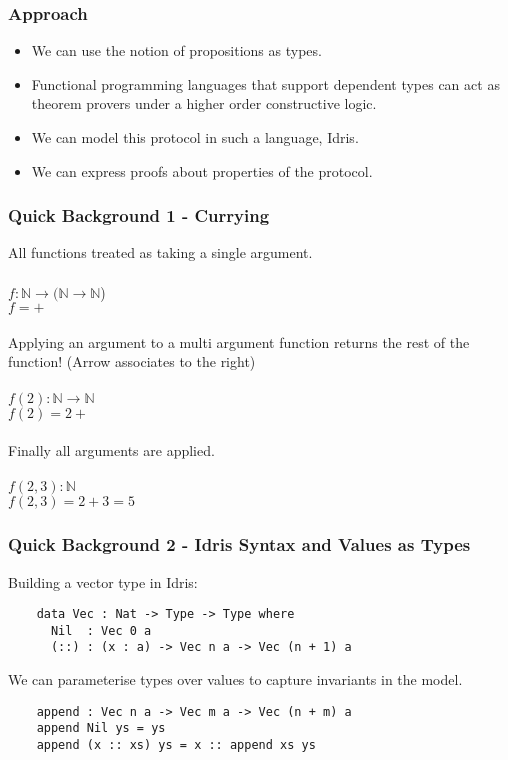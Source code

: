 \documentclass{beamer}
\begin{document}
\begin{frame}[fragile]
  \frametitle{Approach}
  \begin{itemize}
    \item We can use the notion of propositions as types.
    \item Functional programming languages that support dependent
          types can act as theorem provers under a higher order
          constructive logic.
    \item We can model this protocol in such a language, Idris.
    \item We can express proofs about properties of the protocol.
  \end{itemize}
\end{frame}

\begin{frame}[fragile]
  \frametitle{Quick Background 1 - Currying}
  All functions treated as taking a single argument. \\ \\
  $f : \mathbb{N} \rightarrow (\mathbb{N} \rightarrow \mathbb{N}$) 
    \\
  $f = + $ \\ \\
  Applying an argument to a multi argument function returns the 
    rest of the function! (Arrow associates to the right)\\ \\
  $f(2) : \mathbb{N} \rightarrow \mathbb{N}$ \\
  $f(2) = 2 + $ \\ \\
  Finally all arguments are applied. \\ \\
  $f(2, 3) : \mathbb{N}$ \\
  $f(2, 3) = 2 + 3 = 5 $
\end{frame}

\begin{frame}[fragile]
  \frametitle{Quick Background 2 - Idris Syntax and Values as Types}
  Building a vector type in Idris: 
  \begin{verbatim}
    data Vec : Nat -> Type -> Type where
      Nil  : Vec 0 a
      (::) : (x : a) -> Vec n a -> Vec (n + 1) a
  \end{verbatim}
  We can parameterise types over values to capture invariants in 
  the model.
  \begin{verbatim}
    append : Vec n a -> Vec m a -> Vec (n + m) a
    append Nil ys = ys
    append (x :: xs) ys = x :: append xs ys 
  \end{verbatim}
\end{frame}
\end{document}
